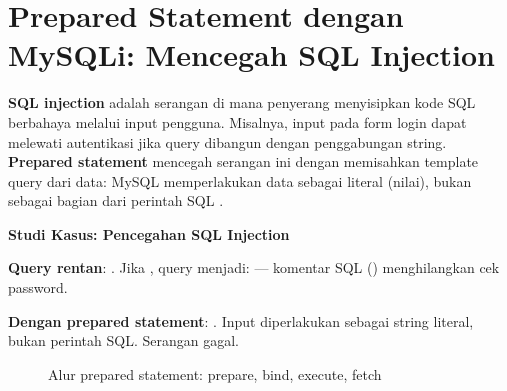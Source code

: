 \section{Prepared Statement dengan MySQLi: Mencegah SQL Injection}

\textbf{SQL injection} adalah serangan di mana penyerang menyisipkan kode SQL berbahaya melalui input pengguna. Misalnya, input  pada form login dapat melewati autentikasi jika query dibangun dengan penggabungan string. \textbf{Prepared statement} mencegah serangan ini dengan memisahkan template query dari data: MySQL memperlakukan data sebagai literal (nilai), bukan sebagai bagian dari perintah SQL \cite{phpRightWay}.

\begin{contoh}
\textbf{Studi Kasus: Pencegahan SQL Injection}

\textbf{Query rentan}: . Jika , query menjadi:  --- komentar SQL (\code{--}) menghilangkan cek password.

\textbf{Dengan prepared statement}: . Input  diperlakukan sebagai string literal, bukan perintah SQL. Serangan gagal.
\end{contoh}

\begin{figure}[ht]
\centering
{}
\caption{Alur prepared statement: prepare, bind, execute, fetch}
\end{figure}


